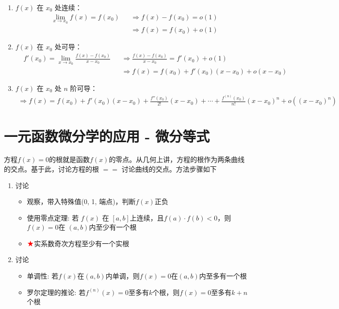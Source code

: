 \documentclass[a4paper,12pt]{article}
\begin{document}
    \begin{enumerate}
        \item $f(x)$ 在 $x_0$ 处连续：
        \[
            \begin{aligned}
                &\lim_{x \to x_0} f(x) = f(x_0)
                &&\Rightarrow f(x) - f(x_0) = o(1) \\
                &&&\Rightarrow f(x) = f(x_0) + o(1)
            \end{aligned}
        \]

        \item $f(x)$ 在 $x_0$ 处可导：
        \[
            \begin{aligned}
                &f'(x_0)
                = \lim_{x \to x_0} \frac{f(x)-f(x_0)}{x-x_0}
                &&\Rightarrow
                \frac{f(x)-f(x_0)}{x-x_0}
                = f'(x_0) + o(1) \\
                &&&\Rightarrow
                f(x) = f(x_0) + f'(x_0)(x-x_0) + o(x-x_0)
            \end{aligned}
        \]

        \item $f(x)$ 在 $x_0$ 处 $n$ 阶可导：
        \[
            \begin{aligned}
                \Rightarrow
                f(x)
                = f(x_0) + f'(x_0)(x - x_0) + \displaystyle\frac{f''(x_0)}{2!}(x - x_0) + \cdots + \displaystyle\frac{f^{(n)}(x_0)}{n!}(x - x_0)^{n} + o((x - x_0)^n)
            \end{aligned}
        \]
    \end{enumerate}


    \section{一元函数微分学的应用 - 微分等式}

    方程$f(x) = 0$的根就是函数$f(x)$的零点。从几何上讲，方程的根作为两条曲线的交点。基于此，讨论方程的根 $==$ 讨论曲线的交点。方法步骤如下

    \begin{enumerate}
        \item 讨论{\color{red}{存在性}}
        \begin{itemize}
            \item 观察，带入特殊值(0, 1, 端点)，判断$f(x)$正负
            \item 使用零点定理: 若 $f(x)$ 在 $[a, b]$上连续，且$f(a)\cdot f(b) < 0$，则$f(x) = 0$在 $(a, b)$内至少有一个根
            \item $\color{red}{\bigstar}$实系数奇次方程至少有一个实根
        \end{itemize}
        \item 讨论{\color{red}{唯一性}}
        \begin{itemize}
            \item 单调性: 若$f(x)$在$(a, b)$内单调，则$f(x) = 0$在$(a, b)$内至多有一个根
            \item 罗尔定理的推论: 若$f^{(n)}(x) = 0$至多有$k$个根，则$f(x) = 0$至多有$k + n$个根
        \end{itemize}
    \end{enumerate}
\end{document}
